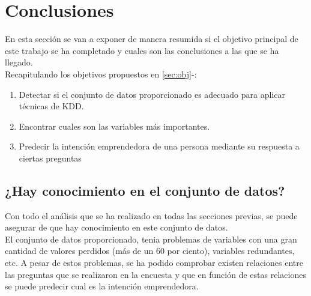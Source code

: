 \chapter{Conclusiones}
\label{sec:conclusiones}
En esta sección se van a exponer de manera resumida si el objetivo principal de este trabajo se ha completado y cuales son las conclusiones a las que se ha llegado.\\
\linebreak
Recapitulando los objetivos propuestos en \ref{sec:obj}-:
\begin{enumerate}[1.]
	\item Detectar si el conjunto de datos proporcionado es adecuado para aplicar técnicas de KDD.
	\item Encontrar cuales son las variables más importantes.
	\item Predecir la intención emprendedora de una persona mediante su respuesta a ciertas preguntas
\end{enumerate}

\section{¿Hay conocimiento en el conjunto de datos?}
Con todo el análisis que se ha realizado en todas las secciones previas, se puede asegurar de que hay conocimiento en este conjunto de datos.\\
El conjunto de datos proporcionado, tenia problemas de variables con una gran cantidad de valores perdidos (más de un 60 por ciento), variables redundantes, etc. A pesar de estos problemas, se ha podido comprobar existen relaciones entre las preguntas que se realizaron en la encuesta y que en función de estas relaciones se puede predecir cual es la intención emprendedora.
